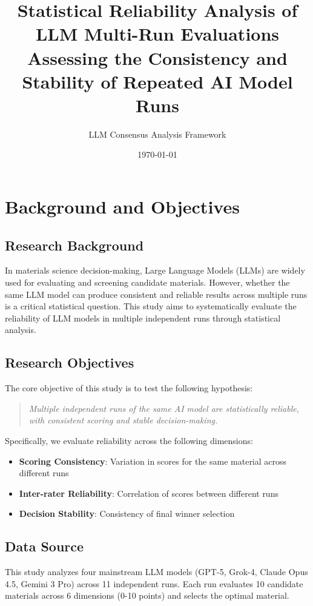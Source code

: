 \documentclass[12pt,a4paper]{article}
\title{\textbf{Statistical Reliability Analysis of LLM Multi-Run Evaluations}\\
\large Assessing the Consistency and Stability of Repeated AI Model Runs}
\author{LLM Consensus Analysis Framework}
\date{\today}
\begin{document}
\maketitle

\tableofcontents
\newpage


\section{Background and Objectives}

\subsection{Research Background}
In materials science decision-making, Large Language Models (LLMs) are widely used for evaluating and screening candidate materials. However, whether the same LLM model can produce consistent and reliable results across multiple runs is a critical statistical question. This study aims to systematically evaluate the reliability of LLM models in multiple independent runs through statistical analysis.

\subsection{Research Objectives}
The core objective of this study is to test the following hypothesis:
\begin{quote}
\textit{Multiple independent runs of the same AI model are statistically reliable, with consistent scoring and stable decision-making.}
\end{quote}

Specifically, we evaluate reliability across the following dimensions:
\begin{itemize}
    \item \textbf{Scoring Consistency}: Variation in scores for the same material across different runs
    \item \textbf{Inter-rater Reliability}: Correlation of scores between different runs
    \item \textbf{Decision Stability}: Consistency of final winner selection
\end{itemize}

\subsection{Data Source}
This study analyzes four mainstream LLM models (GPT-5, Grok-4, Claude Opus 4.5, Gemini 3 Pro) across 11 independent runs. Each run evaluates 10 candidate materials across 6 dimensions (0-10 points) and selects the optimal material.
\end{document}
